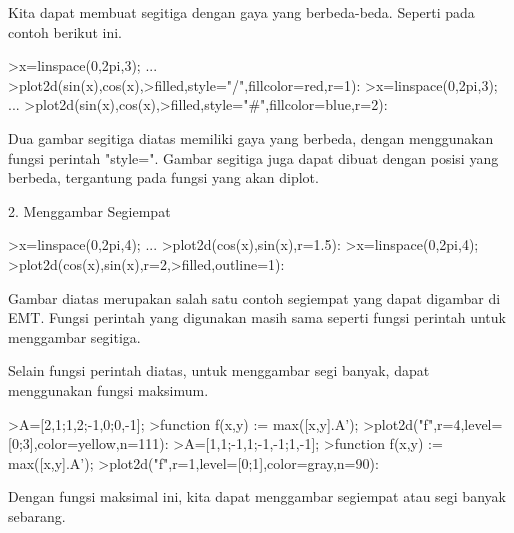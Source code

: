 \documentclass[a4paper,10pt]{article}
\begin{document}
\begin{eulernotebook}
\begin{eulercomment}
\begin{eulercomment}
\begin{eulercomment}
\begin{eulercomment}
\begin{eulercomment}
\begin{eulercomment}
\begin{eulercomment}
\begin{eulercomment}
\begin{eulercomment}
\begin{eulercomment}
\begin{eulercomment}
\begin{eulercomment}
\begin{eulercomment}
Kita dapat membuat segitiga dengan gaya yang berbeda-beda. Seperti
pada contoh berikut ini.
\end{eulercomment}
\begin{eulerprompt}
>x=linspace(0,2pi,3); ...
>plot2d(sin(x),cos(x),>filled,style="/",fillcolor=red,r=1):
>x=linspace(0,2pi,3); ...
>plot2d(sin(x),cos(x),>filled,style="#",fillcolor=blue,r=2):
\end{eulerprompt}
\begin{eulercomment}
Dua gambar segitiga diatas memiliki gaya yang berbeda, dengan
menggunakan fungsi perintah "style=". Gambar segitiga juga dapat
dibuat dengan posisi yang berbeda, tergantung pada fungsi yang akan
diplot.


2. Menggambar Segiempat
\end{eulercomment}
\begin{eulerprompt}
>x=linspace(0,2pi,4); ...
>plot2d(cos(x),sin(x),r=1.5):
>x=linspace(0,2pi,4); 
>plot2d(cos(x),sin(x),r=2,>filled,outline=1):
\end{eulerprompt}
\begin{eulercomment}
Gambar diatas merupakan salah satu contoh segiempat yang dapat
digambar di EMT. Fungsi perintah yang digunakan masih sama seperti
fungsi perintah untuk menggambar segitiga. 

Selain fungsi perintah diatas, untuk menggambar segi banyak, dapat
menggunakan fungsi maksimum.
\end{eulercomment}
\begin{eulerprompt}
>A=[2,1;1,2;-1,0;0,-1];
>function f(x,y) := max([x,y].A');
>plot2d("f",r=4,level=[0;3],color=yellow,n=111):
>A=[1,1;-1,1;-1,-1;1,-1];
>function f(x,y) := max([x,y].A');
>plot2d("f",r=1,level=[0;1],color=gray,n=90):
\end{eulerprompt}
\begin{eulercomment}
Dengan fungsi maksimal ini, kita dapat menggambar segiempat atau segi
banyak sebarang.



\end{eulercomment}
\end{eulercomment}
\end{eulercomment}
\end{eulercomment}
\end{eulercomment}
\end{eulercomment}
\end{eulercomment}
\end{eulercomment}
\end{eulercomment}
\end{eulercomment}
\end{eulercomment}
\end{eulercomment}
\end{eulercomment}
\end{eulernotebook}
\end{document}
